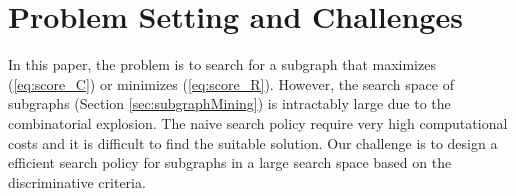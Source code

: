 \section{Problem Setting and Challenges}
In this paper, the problem is to search for a subgraph 
that maximizes (\ref{eq:score_C}) or minimizes (\ref{eq:score_R}).
However, the search space of subgraphs (Section \ref{sec:subgraphMining}) is intractably large
due to the combinatorial explosion.
The naive search policy require very high computational costs 
and it is difficult to find the suitable solution.
Our challenge is to design a efficient search policy for subgraphs in a large search space
based on the discriminative criteria.

